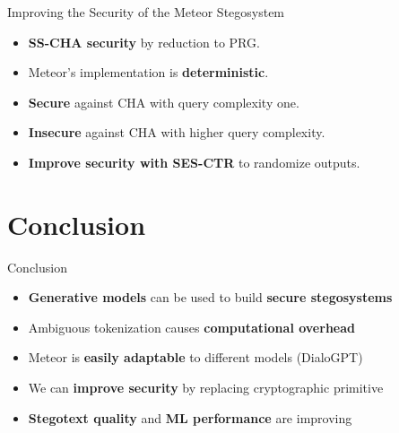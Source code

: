 \documentclass[10pt]{beamer}
\begin{document}
\begin{frame}{Improving the Security of the Meteor Stegosystem}
	\begin{itemize}[<+- | alert@+>]
		\item \textbf{SS-CHA security} by reduction to PRG.
		\item Meteor's implementation is \textbf{deterministic}.
		\item \textbf{Secure} against CHA with query complexity one.
		\item \textbf{Insecure} against CHA with higher query complexity.
		\item \textbf{Improve security with SES-CTR} to randomize outputs.
	\end{itemize}
\end{frame}

\section{Conclusion}

\begin{frame}{Conclusion}
    \begin{itemize}[<+- | alert@+>]
        \item \textbf{Generative models} can be used to build \textbf{secure stegosystems}
        \item Ambiguous tokenization causes \textbf{computational overhead}
        \item Meteor is \textbf{easily adaptable} to different models (DialoGPT)
        \item We can \textbf{improve security} by replacing cryptographic primitive
        \item \textbf{Stegotext quality} and \textbf{ML performance} are improving
    \end{itemize}
    \centering
\end{frame}
    
\end{document}
